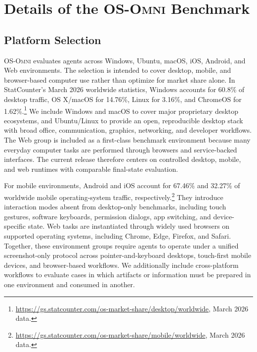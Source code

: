 \section{Details of the \textsc{OS-Omni} Benchmark}

\subsection{Platform Selection}
\label{app:os_selection}
\textsc{OS-Omni} evaluates agents across Windows, Ubuntu, macOS, iOS, Android, and Web environments. The selection is intended to cover desktop, mobile, and browser-based computer use rather than optimize for market share alone. In StatCounter's March 2026 worldwide statistics, Windows accounts for 60.8\% of desktop traffic, OS X/macOS for 14.76\%, Linux for 3.16\%, and ChromeOS for 1.62\%.\footnote{\url{https://gs.statcounter.com/os-market-share/desktop/worldwide}, March 2026 data.} We include Windows and macOS to cover major proprietary desktop ecosystems, and Ubuntu/Linux to provide an open, reproducible desktop stack with broad office, communication, graphics, networking, and developer workflows. The Web group is included as a first-class benchmark environment because many everyday computer tasks are performed through browsers and service-backed interfaces. The current release therefore centers on controlled desktop, mobile, and web runtimes with comparable final-state evaluation.

For mobile environments, Android and iOS account for 67.46\% and 32.27\% of worldwide mobile operating-system traffic, respectively.\footnote{\url{https://gs.statcounter.com/os-market-share/mobile/worldwide}, March 2026 data.} They introduce interaction modes absent from desktop-only benchmarks, including touch gestures, software keyboards, permission dialogs, app switching, and device-specific state. Web tasks are instantiated through widely used browsers on supported operating systems, including Chrome, Edge, Firefox, and Safari. Together, these environment groups require agents to operate under a unified screenshot-only protocol across pointer-and-keyboard desktops, touch-first mobile devices, and browser-based workflows. We additionally include cross-platform workflows to evaluate cases in which artifacts or information must be prepared in one environment and consumed in another.


